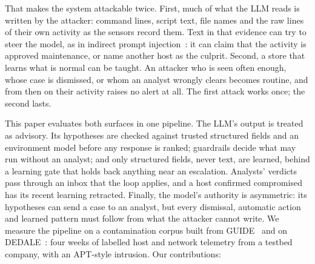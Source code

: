 \documentclass[conference]{IEEEtran}
\begin{document}
That makes the system attackable twice. First, much of what the LLM reads is written by the attacker: command lines,
script text, file names and the raw lines of their own activity as the sensors record them. Text in that evidence
can try to steer the model, as in indirect prompt injection~\cite{greshake}: it can claim that the activity is
approved maintenance, or name another host as the culprit. Second, a store that learns what is normal can be
taught. An attacker who is seen often enough, whose case is dismissed, or whom an analyst wrongly clears becomes
routine, and from then on their activity raises no alert at all. The first attack works once; the second lasts.

This paper evaluates both surfaces in one pipeline. The LLM's output is treated as advisory. Its hypotheses are
checked against trusted structured fields and an environment model before any response is ranked; guardrails
decide what may run without an analyst; and only structured fields, never text, are learned, behind a learning gate
that holds back anything near an escalation. Analysts' verdicts pass through an inbox that the loop applies, and a
host confirmed compromised has its recent learning retracted. Finally, the model's authority is asymmetric: its
hypotheses can send a case to an analyst, but every dismissal, automatic action and learned pattern must follow
from what the attacker cannot write. We measure the pipeline on a contamination corpus
built from GUIDE~\cite{guide} and on DEDALE~\cite{dedale}: four weeks of labelled host and network telemetry from a
testbed company, with an APT-style intrusion. Our contributions:
\end{document}
